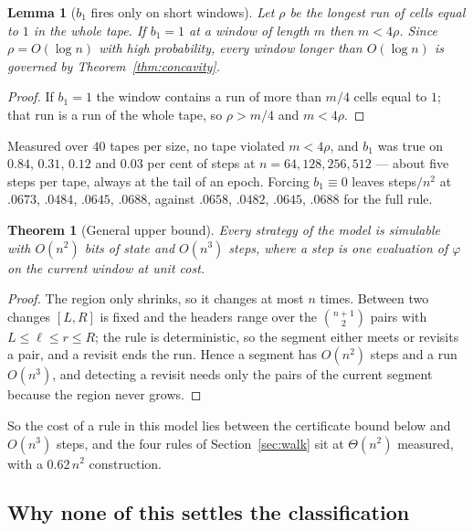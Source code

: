 \documentclass[11pt]{article}
\newtheorem{theorem}{Theorem}
\newtheorem{lemma}{Lemma}
\begin{document}
\begin{lemma}[$b_1$ fires only on short windows]\label{lem:short}
Let $\rho$ be the longest run of cells equal to $1$ in the whole tape. If $b_1=1$ at a window of
length $m$ then $m<4\rho$. Since $\rho=O(\log n)$ with high probability, every window longer than
$O(\log n)$ is governed by Theorem~\ref{thm:concavity}.
\end{lemma}

\begin{proof}
If $b_1=1$ the window contains a run of more than $m/4$ cells equal to $1$; that run is a run of the
whole tape, so $\rho>m/4$ and $m<4\rho$.
\end{proof}

Measured over $40$ tapes per size, no tape violated $m<4\rho$, and $b_1$ was true on $0.84$, $0.31$,
$0.12$ and $0.03$ per cent of steps at $n=64,128,256,512$ --- about five steps per tape, always at the
tail of an epoch. Forcing $b_1\equiv0$ leaves steps$/n^2$ at $.0673$, $.0484$, $.0645$, $.0688$, against
$.0658$, $.0482$, $.0645$, $.0688$ for the full rule.

\begin{theorem}[General upper bound]\label{thm:upper}
Every strategy of the model is simulable with $O(n^2)$ bits of state and $O(n^3)$ steps, where a step
is one evaluation of $\varphi$ on the current window at unit cost.
\end{theorem}

\begin{proof}
The region only shrinks, so it changes at most $n$ times. Between two changes $[L,R]$ is fixed and the
headers range over the $\binom{n+1}{2}$ pairs with $L\le\ell\le r\le R$; the rule is deterministic, so
the segment either meets or revisits a pair, and a revisit ends the run. Hence a segment has $O(n^2)$
steps and a run $O(n^3)$, and detecting a revisit needs only the pairs of the current segment because
the region never grows.
\end{proof}

So the cost of a rule in this model lies between the certificate bound below and $O(n^3)$ steps, and
the four rules of Section~\ref{sec:walk} sit at $\Theta(n^2)$ measured, with a $0.62\,n^2$
construction.

\subsection*{Why none of this settles the classification}
\end{document}
